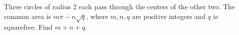 Three circles of radius 2 each pass through the centers of the other two. The common area is $ m\pi-n\sqrt q $, where $ m,n,q $ are positive integers and $ q $ is squarefree. Find $ m+n+q $.
